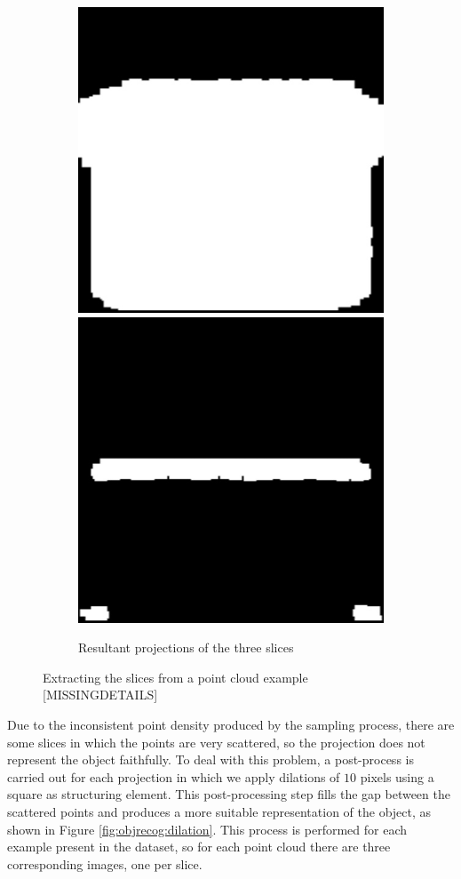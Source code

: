 \begin{figure}[!t]
\begin{subfigure}[t]{0.8\linewidth}
        \includegraphics[height=0.32\linewidth]{Figures/ObjRecog/slices/chair_slice32}
        \includegraphics[height=0.32\linewidth]{Figures/ObjRecog/slices/chair_slice33}
        \caption{Resultant projections of the three slices}
        \label{fig:slicing_c}
	\end{subfigure}
    \caption{Extracting the slices from a point cloud example [MISSINGDETAILS]}
    \label{fig:objrecog:slicing}
\end{figure}

Due to the inconsistent point density produced by the sampling process, there are some slices in which the points are very scattered, so the projection does not represent the object faithfully. To deal with this problem, a post-process is carried out for each projection in which we apply dilations of $10$ pixels using a square as structuring element. This post-processing step fills the gap between the scattered points and produces a more suitable representation of the object, as shown in Figure \ref{fig:objrecog:dilation}. This process is performed for each example present in the dataset, so for each point cloud there are three corresponding images, one per slice.

